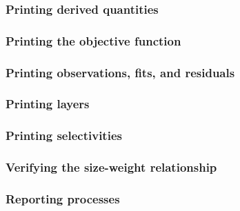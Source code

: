 \subsubsection{Printing derived quantities}

\subsubsection{Printing the objective function}

\subsubsection{Printing observations, fits, and residuals}

\subsubsection{Printing layers}

\subsubsection{Printing selectivities}

\subsubsection{Verifying the size-weight relationship\label{sec:report-weight-at-size}}

\subsubsection{Reporting processes}
